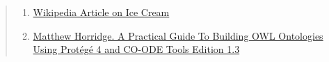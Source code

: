 \documentclass[12pt]{article}
\begin{document}
\begin{quote}

    \begin{enumerate}
    
    \item \href{https://en.wikipedia.org/wiki/Ice_cream}{Wikipedia Article on Ice Cream}
    
    \item \href{https://www.researchgate.net/publication/272829948_A_Practical_Guide_To_Building_OWL_Ontologies_Using_Protege_4_and_CO-ODE_Tools_Edition_13}{Matthew Horridge. A Practical Guide To Building OWL Ontologies Using Protégé 4 and CO-ODE Tools Edition 1.3}

    
    
    \end{enumerate}

\end{quote}
\end{document}
